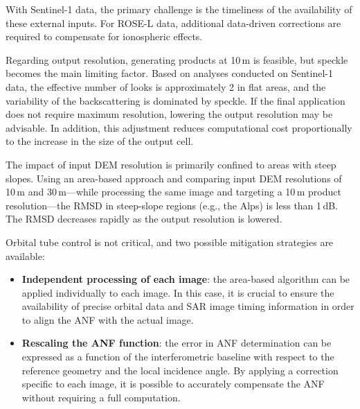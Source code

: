 With Sentinel-1 data, the primary challenge is the timeliness of the availability of these external inputs. For ROSE-L data, additional data-driven corrections are required to compensate for ionospheric effects.

Regarding output resolution, generating products at 10 m is feasible, but speckle becomes the main limiting factor. Based on analyses conducted on Sentinel-1 data, the effective number of looks is approximately 2 in flat areas, and the variability of the backscattering is dominated by speckle. If the final application does not require maximum resolution, lowering the output resolution may be advisable. In addition, this adjustment reduces computational cost proportionally to the increase in the size of the output cell.

The impact of input DEM resolution is primarily confined to areas with steep slopes. Using an area-based approach and comparing input DEM resolutions of 10 m and 30 m—while processing the same image and targeting a 10 m product resolution—the RMSD in steep-slope regions (e.g., the Alps) is less than 1 dB. The RMSD decreases rapidly as the output resolution is lowered.

Orbital tube control is not critical, and two possible mitigation strategies are available:
\begin{itemize} 
    \item \textbf{Independent processing of each image}: the area-based algorithm can be applied individually to each image. In this case, it is crucial to ensure the availability of precise orbital data and SAR image timing information in order to align the ANF with the actual image. 
    \item \textbf{Rescaling the ANF function}: the error in ANF determination can be expressed as a function of the interferometric baseline with respect to the reference geometry and the local incidence angle. By applying a correction specific to each image, it is possible to accurately compensate the ANF without requiring a full computation. 
\end{itemize}


